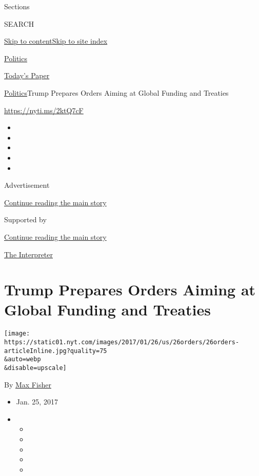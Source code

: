 Sections

SEARCH

\protect\hyperlink{site-content}{Skip to
content}\protect\hyperlink{site-index}{Skip to site index}

\href{https://www.nytimes.com/section/politics}{Politics}

\href{https://myaccount.nytimes.com/auth/login?response_type=cookie\&client_id=vi}{}

\href{https://www.nytimes.com/section/todayspaper}{Today's Paper}

\href{/section/politics}{Politics}\textbar{}Trump Prepares Orders Aiming
at Global Funding and Treaties

\url{https://nyti.ms/2ktQ7cF}

\begin{itemize}
\item
\item
\item
\item
\item
\end{itemize}

Advertisement

\protect\hyperlink{after-top}{Continue reading the main story}

Supported by

\protect\hyperlink{after-sponsor}{Continue reading the main story}

\href{/column/the-interpreter}{The Interpreter}

\hypertarget{trump-prepares-orders-aiming-at-global-funding-and-treaties}{%
\section{Trump Prepares Orders Aiming at Global Funding and
Treaties}\label{trump-prepares-orders-aiming-at-global-funding-and-treaties}}

\texttt{[image: https://static01.nyt.com/images/2017/01/26/us/26orders/26orders-articleInline.jpg?quality=75\\\&auto=webp\\\&disable=upscale]}

By \href{https://www.nytimes.com/by/max-fisher}{Max Fisher}

\begin{itemize}
\item
  Jan. 25, 2017
\item
  \begin{itemize}
  \item
  \item
  \item
  \item
  \item
  \end{itemize}
\end{itemize}


